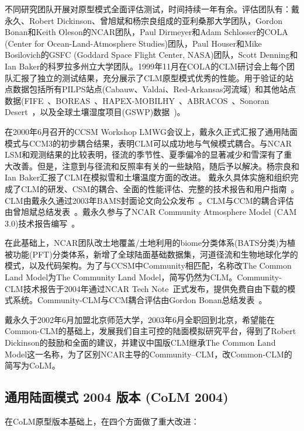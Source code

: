 不同研究团队开展对原型模式全面评估测试，时间持续一年有余。评估团队有：戴永久、Robert Dickinson、曾旭斌和杨宗良组成的亚利桑那大学团队，Gordon Bonan和Keith Oleson的NCAR团队，Paul Dirmeyer和Adam Schlosser的COLA (Center for Ocean-Land-Atmosphere Studies)团队，Paul Houser和Mike Bosilovich的GSFC (Goddard Space Flight Center, NASA)团队，Scott Denning和Ian Baker的科罗拉多州立大学团队。1999年11月在COLA的CLM研讨会上每个团队汇报了独立的测试结果，充分展示了CLM原型模式优秀的性能。用于验证的站点数据包括所有PILPS站点(Cabauw、Valdai、Red-Arkansas河流域)~\citep{Henderson-Sellers_1993_PILPS}和其他站点数据(FIFE~\citep{Sellers88FIFE}、BOREAS~\citep{Sellers95BOREAS}、HAPEX-MOBILHY~\citep{Andre1986hapex}、ABRACOS~\citep{Gash96ABRACOS}、Sonoran Desert~\citep{Unland1996surface}，以及全球土壤湿度项目(GSWP)数据~\citep{Dirmeyer1999global})。

在2000年6月召开的CCSM Workshop LMWG会议上，戴永久正式汇报了通用陆面模式与CCM3的初步耦合结果，表明CLM可以成功地与气候模式耦合。与NCAR LSM和观测结果的比较表明，径流的季节性、夏季偏冷的显著减少和雪深有了重大改善。但是，注意到与径流和反照率有关的一些缺陷，随后予以解决。杨宗良和Ian Baker汇报了CLM在模拟雪和土壤温度方面的改进。
戴永久具体实施和组织完成了CLM的研发、CSM的耦合、全面的性能评估、完整的技术报告和用户指南~\citep{Dai2001CoLM}。CLM由戴永久通过2003年BAMS封面论文向公众发布~\citep{dai2003common}。CLM与CCM的耦合评估由曾旭斌总结发表~\citep{zeng2002coupling}。戴永久参与了NCAR Community Atmosphere Model (CAM 3.0)技术报告编写~\citep{Collins2004CAM}。

在此基础上，NCAR团队改土地覆盖/土地利用的biome分类体系(BATS分类)为植被功能(PFT)分类体系，新增了全球陆面基础数据集，河道径流和生物地球化学的模式，以及代码架构。为了与CCSM中Community相匹配，名称改The Common Land Model为The Community Land Model，简写仍然为CLM。Community-CLM技术报告于2004年通过NCAR Tech Note~\citep{Oleson2004CLM}正式发布，提供免费自由下载的模式系统。Community-CLM与CCM耦合评估由Gordon Bonan总结发表~\citep{Bonan2002CLM}。


戴永久于2002年6月加盟北京师范大学，2003年6月全职回到北京，希望能在Common-CLM的基础上，发展我们自主可控的陆面模拟研究平台，得到了Robert Dickinson的鼓励和全面的建议，并建议中国版CLM继承The Common Land Model这一名称，为了区别NCAR主导的Community–CLM，改Common-CLM的简写为CoLM。



\subsection{通用陆面模式 2004 版本 (CoLM 2004)}
在CoLM原型版本基础上，在四个方面做了重大改进：

